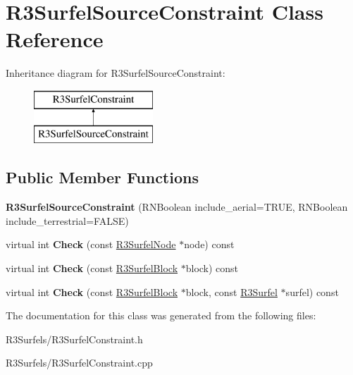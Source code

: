 \hypertarget{class_r3_surfel_source_constraint}{}\section{R3\+Surfel\+Source\+Constraint Class Reference}
\label{class_r3_surfel_source_constraint}
Inheritance diagram for R3\+Surfel\+Source\+Constraint\+:\begin{figure}[H]
\begin{center}
\leavevmode
\includegraphics[height=2.000000cm]{class_r3_surfel_source_constraint}
\end{center}
\end{figure}
\subsection*{Public Member Functions}
\begin{DoxyCompactItemize}
\item 
{\bfseries R3\+Surfel\+Source\+Constraint} (R\+N\+Boolean include\+\_\+aerial=T\+R\+UE, R\+N\+Boolean include\+\_\+terrestrial=F\+A\+L\+SE)\hypertarget{class_r3_surfel_source_constraint_a3f631fd9196fbc4a06624c96859029cd}{}\label{class_r3_surfel_source_constraint_a3f631fd9196fbc4a06624c96859029cd}

\item 
virtual int {\bfseries Check} (const \hyperlink{class_r3_surfel_node}{R3\+Surfel\+Node} $\ast$node) const \hypertarget{class_r3_surfel_source_constraint_af137866fa25d71a2ad777c85b348f1cf}{}\label{class_r3_surfel_source_constraint_af137866fa25d71a2ad777c85b348f1cf}

\item 
virtual int {\bfseries Check} (const \hyperlink{class_r3_surfel_block}{R3\+Surfel\+Block} $\ast$block) const \hypertarget{class_r3_surfel_source_constraint_a58a6cae91e174f3eb3be5dae7dbc62ad}{}\label{class_r3_surfel_source_constraint_a58a6cae91e174f3eb3be5dae7dbc62ad}

\item 
virtual int {\bfseries Check} (const \hyperlink{class_r3_surfel_block}{R3\+Surfel\+Block} $\ast$block, const \hyperlink{class_r3_surfel}{R3\+Surfel} $\ast$surfel) const \hypertarget{class_r3_surfel_source_constraint_a681c64091b264120229e174e34c674e1}{}\label{class_r3_surfel_source_constraint_a681c64091b264120229e174e34c674e1}

\end{DoxyCompactItemize}


The documentation for this class was generated from the following files\+:\begin{DoxyCompactItemize}
\item 
R3\+Surfels/R3\+Surfel\+Constraint.\+h\item 
R3\+Surfels/R3\+Surfel\+Constraint.\+cpp\end{DoxyCompactItemize}
